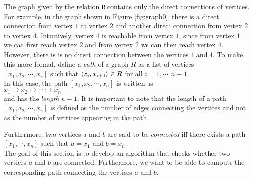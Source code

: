 \noindent
The graph given by the relation \texttt{R} contains only the direct connections of vertices.  For example, in
the graph shown in Figure \ref{fig:graph0}, there is a direct connection from vertex $1$ to vertex $2$ and
another direct connection from vertex $2$ to vertex $4$.  Intuitively, vertex $4$ is reachable from vertex $1$,
since from vertex $1$ we can first reach vertex $2$ and from vertex $2$ we can then reach vertex $4$.  However,
there is is no direct connection between the vertices $1$ and $4$.  To make this more formal, define
a \colorbox{amethyst}{\emph{path}} 
of a graph $R$ as a list of vertices
\\[0.2cm]
\hspace*{1.3cm}
$[x_1, x_2, \cdots, x_n]$ \quad such that \quad $\pair(x_i,x_{i+1}) \in R$ \quad for all $i=1,\cdots,n-1$.
\\[0.2cm]
In this case, the path $[x_1, x_2, \cdots, x_n]$ is written as
\\[0.2cm]
\hspace*{1.3cm}
$x_1 \mapsto x_2 \mapsto \cdots \mapsto x_n$
\\[0.2cm]
and has the \emph{length} $n-1$.  It is important to note that the length of a path
$[x_1,x_2,\cdots,x_n]$ is defined as the number of edges connecting the vertices and not as the
number of vertices appearing in the path.

Furthermore,  two vertices $a$ and $b$ are said to be \colorbox{amethyst}{\emph{connected}} iff there exists a path
\\[0.2cm]
\hspace*{1.3cm}
$[x_1,\cdots,x_n]$ \quad such that \quad $a = x_1$ \quad and \quad $b = x_n$.
\\[0.2cm]
The goal of this section is to develop an algorithm that checks whether two vertices $a$ and $b$ are connected.
Furthermore, we want to be able to compute the corresponding path connecting the vertices $a$ and $b$.


